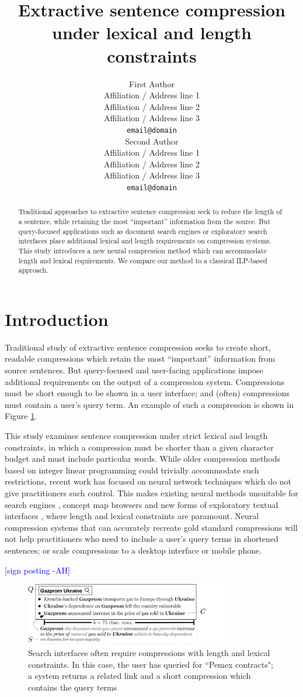 \documentclass[11pt,a4paper]{article}
\title{Extractive sentence compression under lexical and length constraints}
\author{First Author \\
  Affiliation / Address line 1 \\
  Affiliation / Address line 2 \\
  Affiliation / Address line 3 \\
  {\tt email@domain} \\\And
  Second Author \\
  Affiliation / Address line 1 \\
  Affiliation / Address line 2 \\
  Affiliation / Address line 3 \\
  {\tt email@domain} \\}
\date{}
\newcommand{\ahcomment}[1]{\textcolor{blue}{[#1 -AH]}}
\begin{document}
\maketitle

\begin{abstract}
Traditional approaches to extractive sentence compression seek to reduce the length of a sentence, while retaining the most ``important'' information from the source. But query-focused applications such as document search engines or exploratory search interfaces place additional lexical and length requirements on compression systems. This study introduces a new neural compression method which can accommodate length and lexical requirements.  We compare our method to a classical ILP-based approach.
\end{abstract}

\section{Introduction}
Traditional study of extractive sentence compression seeks to create short, readable compressions which retain the most ``important'' information from source sentences. But query-focused and user-facing applications impose additional requirements on the output of a compression system. Compressions must be short enough to be shown in a user interface; and (often) compressions must contain a user's query term. An example of such a compression is shown in Figure \ref{f:qf}.


This study examines sentence compression under strict lexical and length constraints, in which a compression must be shorter than a given character budget and must include particular words. While older compression methods based on integer linear programming could trivially accommodate such restrictions, recent work has focused on neural network techniques which do not give practitioners such control. This makes existing neural methods unsuitable for search engines \cite{hearst2009search}, concept map browsers \cite{falke2017graphdocexplore} and new forms of exploratory textual interfaces \cite{marchionini2006exploratory}, where length and lexical constraints are paramount. Neural compression systems that can accurately recreate gold standard compressions will not help practitioners who need to include a user's query terms in shortened sentences; or scale compressions to a desktop interface or mobile phone.

\ahcomment{sign posting}

\begin{figure}[htb!]
\includegraphics[width=9cm]{qf.pdf}
\caption{Search interfaces often require compressions with length and lexical constraints. In this case, the user has queried for ``Pemex contracts"; a system returns a related link and a short compression which contains the query terms}
\label{f:qf}
\end{figure}
\end{document}
